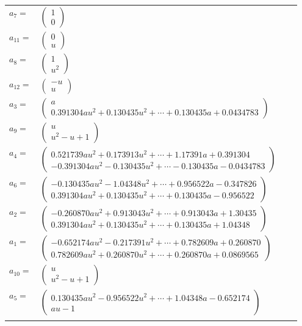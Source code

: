 \documentclass[1p]{elsarticle_modified}
\theoremstyle{definition}
\begin{document}
\begin{tabular}{m{7pt} m{180pt} m{7pt} m{180pt} }
\flushright $a_{7}=$&$\begin{pmatrix}1\\0\end{pmatrix}$ \\
\flushright $a_{11}=$&$\begin{pmatrix}0\\u\end{pmatrix}$ \\
\flushright $a_{8}=$&$\begin{pmatrix}1\\u^2\end{pmatrix}$ \\
\flushright $a_{12}=$&$\begin{pmatrix}- u\\u\end{pmatrix}$ \\
\flushright $a_{3}=$&$\begin{pmatrix}a\\0.391304 a u^{2}+0.130435 u^{2}+\cdots+0.130435 a+0.0434783\end{pmatrix}$ \\
\flushright $a_{9}=$&$\begin{pmatrix}u\\u^2- u+1\end{pmatrix}$ \\
\flushright $a_{4}=$&$\begin{pmatrix}0.521739 a u^{2}+0.173913 u^{2}+\cdots+1.17391 a+0.391304\\-0.391304 a u^{2}-0.130435 u^{2}+\cdots-0.130435 a-0.0434783\end{pmatrix}$ \\
\flushright $a_{6}=$&$\begin{pmatrix}-0.130435 a u^{2}-1.04348 u^{2}+\cdots+0.956522 a-0.347826\\0.391304 a u^{2}+0.130435 u^{2}+\cdots+0.130435 a-0.956522\end{pmatrix}$ \\
\flushright $a_{2}=$&$\begin{pmatrix}-0.260870 a u^{2}+0.913043 u^{2}+\cdots+0.913043 a+1.30435\\0.391304 a u^{2}+0.130435 u^{2}+\cdots+0.130435 a+1.04348\end{pmatrix}$ \\
\flushright $a_{1}=$&$\begin{pmatrix}-0.652174 a u^{2}-0.217391 u^{2}+\cdots+0.782609 a+0.260870\\0.782609 a u^{2}+0.260870 u^{2}+\cdots+0.260870 a+0.0869565\end{pmatrix}$ \\
\flushright $a_{10}=$&$\begin{pmatrix}u\\u^2- u+1\end{pmatrix}$ \\
\flushright $a_{5}=$&$\begin{pmatrix}0.130435 a u^{2}-0.956522 u^{2}+\cdots+1.04348 a-0.652174\\a u-1\end{pmatrix}$\\&\end{tabular}
\end{document}
